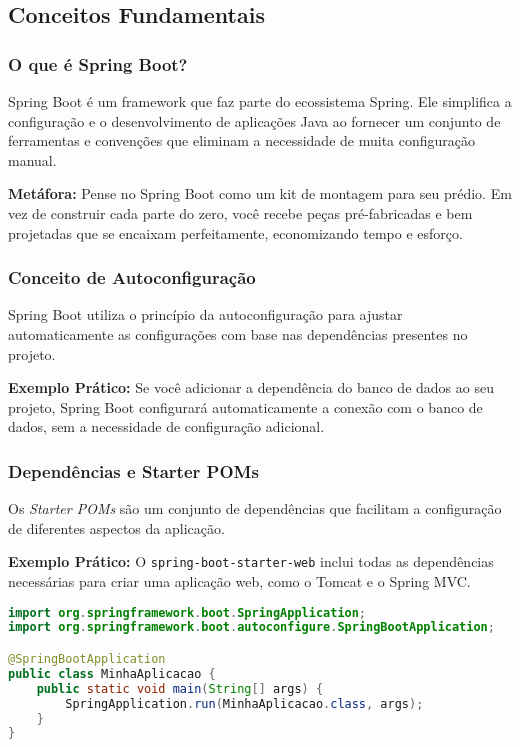 \documentclass[a4paper,12pt]{book}
\begin{document}
\subsection{Conceitos Fundamentais}

\subsubsection{O que é Spring Boot?}
Spring Boot é um framework que faz parte do ecossistema Spring. Ele simplifica a configuração e o desenvolvimento de aplicações Java ao fornecer um conjunto de ferramentas e convenções que eliminam a necessidade de muita configuração manual.

\textbf{Metáfora:} Pense no Spring Boot como um kit de montagem para seu prédio. Em vez de construir cada parte do zero, você recebe peças pré-fabricadas e bem projetadas que se encaixam perfeitamente, economizando tempo e esforço.

\subsubsection{Conceito de Autoconfiguração}
Spring Boot utiliza o princípio da autoconfiguração para ajustar automaticamente as configurações com base nas dependências presentes no projeto.

\textbf{Exemplo Prático:} Se você adicionar a dependência do banco de dados ao seu projeto, Spring Boot configurará automaticamente a conexão com o banco de dados, sem a necessidade de configuração adicional.

\subsubsection{Dependências e Starter POMs}
Os \textit{Starter POMs} são um conjunto de dependências que facilitam a configuração de diferentes aspectos da aplicação.

\textbf{Exemplo Prático:} O \texttt{spring-boot-starter-web} inclui todas as dependências necessárias para criar uma aplicação web, como o Tomcat e o Spring MVC.

\begin{lstlisting}[language=Java]
import org.springframework.boot.SpringApplication;
import org.springframework.boot.autoconfigure.SpringBootApplication;

@SpringBootApplication
public class MinhaAplicacao {
    public static void main(String[] args) {
        SpringApplication.run(MinhaAplicacao.class, args);
    }
}
\end{lstlisting}
\end{document}
